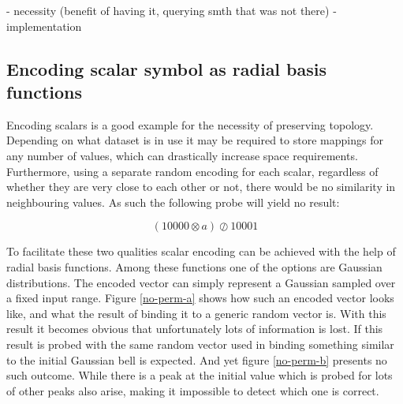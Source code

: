\documentclass[conference]{IEEEtran}
\begin{document}
	- necessity (benefit of having it, querying smth that was not there)
	- implementation
	

 
	
	\subsection{Encoding scalar symbol as radial basis functions}
	
	Encoding scalars is a good example for the necessity of preserving topology.
Depending on what dataset is in use it may be required to store mappings for any number of values, which can drastically increase space requirements.
Furthermore, using a separate random encoding for each scalar, regardless of whether they are very close to each other or not, there would be no similarity in neighbouring values.
As such the following probe will yield no result:
	
	\begin{equation}
	(10000 \otimes a) \oslash 10001
	\end{equation}
	
	To facilitate these two qualities scalar encoding can be achieved with the help of radial basis functions. Among these functions one of the options are Gaussian distributions.
The encoded vector can simply represent a Gaussian sampled over a fixed input range.
Figure \ref{no-perm-a} shows how such an encoded vector looks like, and what the result of binding it to a generic random vector is.
With this result it becomes obvious that unfortunately lots of information is lost.
If this result is probed with the same random vector used in binding something similar to the initial Gaussian bell is expected.
And yet figure \ref{no-perm-b} presents no such outcome.
While there is a peak at the initial value which is probed for lots of other peaks also arise, making it impossible to detect which one is correct.
\end{document}
